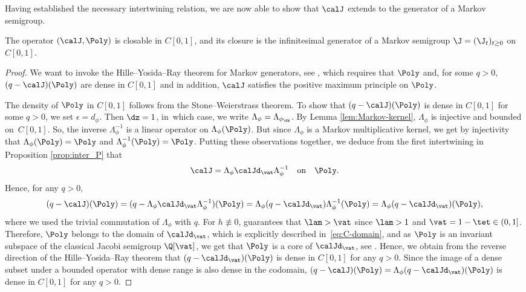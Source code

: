 Having established the necessary intertwining relation, we are now able to show that $\calJ$ extends to the generator of a Markov semigroup.

\begin{lemma}
\label{lem:feller}
The operator $(\calJ ,\Poly)$ is closable in $C[0,1]$, and its closure is the infinitesimal generator of a Markov semigroup $\J = (\J_t)_{t \geq 0}$ on $C[0,1]$.
\end{lemma}

\begin{proof}
We want to invoke the Hille--Yosida--Ray theorem for Markov generators, see \cite[Th.\,1.30]{Levy-Matters-III}, which requires that $\Poly$ and, for some $q>0$, $(q-\calJ)(\Poly)$ are dense in $C[0,1]$ and in addition, $\calJ$ satisfies the positive maximum principle on $\Poly$.

The density of $\Poly$ in $C[0,1]$ follows from the Stone--Weierstrass theorem.
To show that $(q-\calJ)(\Poly)$ is dense in $C[0,1]$ for some $q >0$, we set $\epsilon = d_\phi$. Then
$\dz = 1$, in~which case, we write $\Lambda_{\phi} = \Lambda_{\phi_{\dz}}$.
By Lemma \ref{lem:Markov-kernel}, $\Lambda_{\phi}$ is injective and bounded on~$C[0,1]$. So, the inverse $\Lambda_{\phi}^{-1}$ is a linear operator on $\Lambda_{\phi}(\Poly)$. But since $\Lambda_\phi$ is a Markov multiplicative kernel, we get by injectivity that $\Lambda_\phi(\Poly) = \Poly$ and $\Lambda_\phi^{-1}(\Poly) = \Poly$.
Putting these observations together, we deduce from the first intertwining in Proposition \ref{prop:inter_P} that\vspace*{-3pt}
\begin{equation*}
\calJ =\Lambda_{\phi}\calJd_{\vat} \Lambda_{\phi}^{-1} \quad \text{on} \quad \Poly.
\end{equation*}
Hence, for any $q >0$,\vspace*{-3pt}
\begin{equation*}
(q - \calJ)(\Poly) = (q - \Lambda_\phi \calJd_{\vat} \Lambda_\phi^{-1})(\Poly) = \Lambda_\phi(q-\calJd_{\vat})\Lambda_\phi^{-1}(\Poly) = \Lambda_\phi(q-\calJd_{\vat})(\Poly),
\end{equation*}
where we used the trivial commutation of $\Lambda_\phi$ with $q$. For $h \not\equiv 0$,  guarantees that $\lam > \vat$ since $\lam > 1$ and $\vat = 1-\tet \in (0,1]$. Therefore, $\Poly$ belongs to the domain of $\calJd_{\vat}$, which is explicitly described in~\eqref{eq:C-domain}, and as $\Poly$ is an invariant subspace of the classical Jacobi semigroup $\Q[\vat]$, we get that $\Poly$ is a core of $\calJd_{\vat}$, see \cite[Lem.\,1.34]{Levy-Matters-III}. Hence, we obtain from the
reverse direction of the Hille--Yosida--Ray theorem that $(q-\calJd_{\vat})(\Poly)$ is dense in $C[0,1]$ for any $q > 0$. Since the image of a dense subset under a bounded operator with dense range is also dense in the codomain,
$(q - \calJ)(\Poly) = \Lambda_\phi(q-\calJd_{\vat})(\Poly)$ is dense in $C[0,1]$ for any $q > 0$.


\end{proof}
